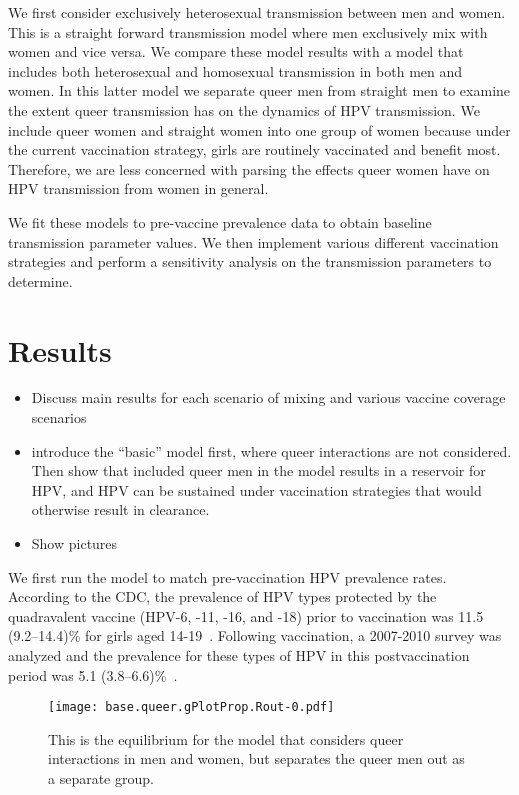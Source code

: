 \documentclass[12pt]{article}
\begin{document}
We first consider exclusively heterosexual transmission between men and women.  This is a straight forward transmission model where men exclusively mix with women and vice versa.  We compare these model results with a model that includes both heterosexual and homosexual transmission in both men and women.  In this latter model we separate queer men from straight men to examine the extent queer transmission has on the dynamics of HPV transmission.  We include queer women and straight women into one group of women because under the current vaccination strategy, girls are routinely vaccinated and benefit most. Therefore, we are less concerned with parsing the effects queer women have on HPV transmission from women in general.

We fit these models to pre-vaccine prevalence data to obtain baseline transmission parameter values.  We then implement various different vaccination strategies and perform a sensitivity analysis on the transmission parameters to determine. 


\section{Results}
\begin{itemize}
\item Discuss main results for each scenario of mixing and various vaccine coverage scenarios
\item introduce the ``basic'' model first, where queer interactions are not considered.  Then show that included queer men in the model results in a reservoir for HPV, and HPV can be sustained under vaccination strategies that would otherwise result in clearance. 
\item Show pictures
\end{itemize}

We first run the model to match pre-vaccination HPV prevalence rates.  According to the CDC, the prevalence of HPV types protected by the quadravalent vaccine (HPV-6, -11, -16, and -18) prior to vaccination was 11.5 (9.2--14.4)\% for girls aged 14-19~\cite{Markowitz:2013}.  Following vaccination, a 2007-2010 survey was analyzed and the prevalence for these types of HPV in this postvaccination period was 5.1 (3.8--6.6)\%~\cite{Markowitz:2013}.

\begin{figure}[h!]
\begin{center}
\texttt{[image: base.queer.gPlotProp.Rout-0.pdf]}
\caption{This is the equilibrium for the model that considers queer interactions in men and women, but separates the queer men out as a separate group.}
\label{fig:QueerNoVacc}
\end{center}
\end{figure}
\end{document}
